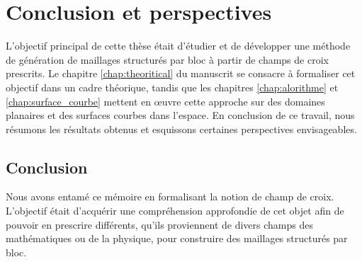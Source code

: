 \chapter{Conclusion et perspectives}
\label{chap:conclusion}

L'objectif principal de cette thèse était d'étudier et de développer une méthode de génération de maillages structurés par bloc à partir de champs de croix prescrits. Le chapitre \ref{chap:theoritical} du manuscrit se consacre à formaliser cet objectif dans un cadre théorique, tandis que les chapitres \ref{chap:alorithme} et \ref{chap:surface_courbe} mettent en œuvre cette approche sur des domaines planaires et des surfaces courbes dans l'espace. En conclusion de ce travail, nous résumons les résultats obtenus et esquissons certaines perspectives envisageables.

\section{Conclusion}

Nous avons entamé ce mémoire en formalisant la notion de champ de croix. L'objectif était d'acquérir une compréhension approfondie de cet objet afin de pouvoir en prescrire différents, qu'ils proviennent de divers champs des mathématiques ou de la physique, pour construire des maillages structurés par bloc.

